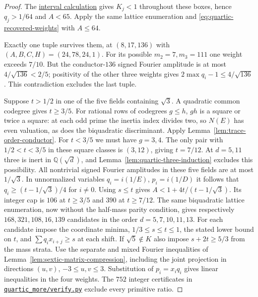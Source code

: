\documentclass[11pt,reqno]{amsart}
\newcommand{\codefile}[1]{\href{https://github.com/sebastienpalcoux/grothendieck-ring-classification/blob/d5750105bb5758f3ad38d2e5464dfcc12c019816/supplements/rank6/sphericality/#1}{\nolinkurl{#1}}}
\newcommand{\codecheck}[2]{\href{https://github.com/sebastienpalcoux/grothendieck-ring-classification/blob/d5750105bb5758f3ad38d2e5464dfcc12c019816/supplements/rank6/sphericality/#1}{#2}}
\theoremstyle{remark}\newtheorem{remark}[theorem]{Remark}
\numberwithin{equation}{section}
\begin{document}
\begin{proof}
The \codecheck{quartic_more/half_bound.py}{interval calculation}
gives $K_j<1$ throughout these boxes, hence $q_j>1/64$ and $A<65$.
Apply the same lattice enumeration and
\eqref{eq:quartic-recovered-weights} with $A\le64$.

Exactly one tuple survives them, at $(8,17,136)$ with
$(A,B,C,H)=(24,78,24,1)$. For its possible $m_2=7,m_3=111$
one weight exceeds $7/10$. But the conductor-$136$ signed Fourier
amplitude is at most $4/\sqrt{136}<2/5$; positivity of the other
three weights gives $2\max q_i-1\le4/\sqrt{136}$. This contradiction
excludes the last tuple.

Suppose $t>1/2$ in one of the five fields containing $\sqrt3$.
A quadratic common codegree gives $t\ge3/5$. For rational rows
of codegrees $g\le h$, $gh$ is a square or twice a square:
at each odd prime the inertia index divides two, so $N(E)$ has
even valuation, as does the biquadratic discriminant. Apply
Lemma~\ref{lem:trace-order-conductor}. For $t<3/5$ we must have
$g=3,4$. The only pair with $1/2<t<3/5$ in these square classes is
$(3,12)$, giving $t=7/12$. At $d=5,11$ three is inert
in $\mathbb Q(\sqrt d)$, and Lemma~\ref{lem:quartic-three-induction}
excludes this possibility.
All nontrivial signed Fourier amplitudes in these five fields are
at most $1/\sqrt3$. In unnormalized variables $q_i=i(1/E)$,
$p_i=i(1/D)$ it follows that $q_i\ge(t-1/\sqrt3)/4$ for
$i\ne0$. Using $s\le t$ gives
$A<1+4t/(t-1/\sqrt3)$. Its integer cap is $106$ at
$t\ge3/5$ and $390$ at $t\ge7/12$. The same biquadratic
lattice enumeration, now without the half-mass parity condition,
gives respectively $168,321,108,16,139$ candidates in the order
$d=5,7,10,11,13$. For each candidate impose the coordinate minima, $1/3\le s\le t\le1$,
the stated lower bound on $t$, and $\sum q_ix_{i+j}\ge s$ at each
shift. If $\sqrt5\notin K$ also impose $s+2t\ge5/3$ from the mass strata. Use the separate and mixed
Fourier inequalities of Lemma~\ref{lem:sextic-matrix-compression},
including the joint projection in directions $(u,v)$,
$-3\le u,v\le3$. Substitution of $p_i=x_iq_i$ gives linear
inequalities in the four weights. The $752$ integer certificates in
\codefile{quartic_more/verify.py} exclude every primitive ratio.
\end{proof}
\end{document}

